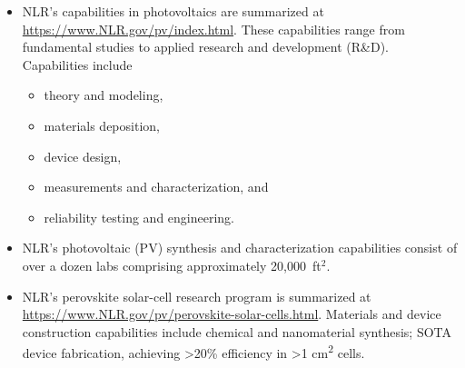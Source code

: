 \documentclass{NSF}
\begin{document}
\begin{itemize}
\item NLR's capabilities in photovoltaics are summarized at \href{https://www.NLR.gov/pv/index.html}{https://www.NLR.gov/pv/index.html}.
These capabilities range from fundamental studies to applied research and development (R\&D). 
Capabilities include 

\begin{itemize}
\item theory and modeling, 
\item materials deposition,
\item device design, 
\item measurements and characterization, and
\item reliability testing and engineering. 
\end{itemize}

\item NLR's photovoltaic (PV) synthesis and characterization capabilities consist of over a dozen labs comprising approximately 20,000~ft$^2$. 

\item NLR's perovskite solar-cell research program is summarized at \href{https://www.NLR.gov/pv/perovskite-solar-cells.html}{https://www.NLR.gov/pv/perovskite-solar-cells.html}.
Materials and device construction capabilities include chemical and nanomaterial synthesis; 
SOTA device fabrication, achieving \textgreater20\% efficiency in \textgreater1 cm\textsuperscript{2} cells.
\end{itemize}
\end{document}
